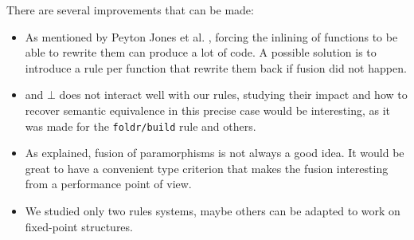 
There are several improvements that can be made:
\begin{itemize}
\item As mentioned by Peyton Jones et al. \cite{pbr}, forcing the inlining of functions to be able to rewrite them can produce a lot of code. A possible solution is to introduce a rule per function that rewrite them back if fusion did not happen.
\item {} and $\bot$ does not interact well with our rules, studying their impact and how to recover semantic equivalence in this precise case would be interesting, as it was made for the \verb|foldr/build| rule and others.
\item As explained, fusion of paramorphisms is not always a good idea. It would be great to have a convenient type criterion that makes the fusion interesting from a performance point of view.
\item We studied only two rules systems, maybe others can be adapted to work on fixed-point structures.
\end{itemize}
